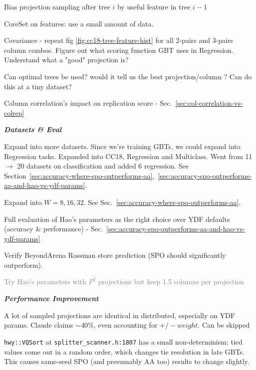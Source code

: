 \documentclass[sigconf,screen]{acmart}
\newcommand{\done}{\rlap{$\square$}{\raisebox{2pt}{\large\hspace{1pt}\checkmark}}\hspace{-2.5pt}}
\begin{document}
\begin{todolist}
    \item Bias projection sampling after tree $i$ by useful feature in tree $i-1$
    \item CoreSet on features: use a small amount of data.
    \item Covariance - repeat fig \ref{fig:cc18-tree-feature-hist} for all 2-pairs and 3-pairs column combos. Figure out what scoring function GBT uses in Regression. Understand what a "good" projection is?
    \item Can optimal trees be used? would it tell us the best projection/column ? Can do this at a tiny dataset?
    \item[\done] [\textbf{Extra}] Column correlation's impact on replication score - Sec.~\ref{sec:col-correlation-vs-colrep}
\end{todolist}

\textbf{\textit{Datasets \& Eval}}

\begin{todolist}
    \item [\done] Expand into more datasets. Since we're training GBTs, we could expand into Regression tasks. Expanded into CC18, Regression and Multiclass. Went from 11 $\to$ 20 datasets on classification and added 6 regression. See Section~\ref{sec:accuracy-where-spo-outperforms-aa},~\ref{sec:accuracy-spo-outperforms-aa-and-hao-vs-ydf-params}.
    \item [\done] Expand into $W=8,16,32$. See Sec.~\ref{sec:accuracy-where-spo-outperforms-aa}.
    \item [\done] Full evaluation of Hao's parameters as the right choice over YDF defaults (accuracy \& performance) - Sec.~\ref{sec:accuracy-spo-outperforms-aa-and-hao-vs-ydf-params}
    \item Verify BeyondArena Rossman store prediction (SPO should significantly outperform).
    \item \textcolor{gray}{Try Hao's parameters with $F^2$ projections but keep 1.5 columns per projection}
\end{todolist}

\textbf{\textit{Performance Improvement}}

\begin{todolist}
    \item A lot of sampled projections are identical in distributed, especially on YDF params. Claude claims $\sim 40\%$, even accounting for $+/- weight$. Can be skipped
    \item \texttt{hwy::VQSort} at \texttt{splitter\_scanner.h:1807} has a small non-determinism: tied values come out in a random order, which changes tie resolution in late GBTs. This causes same-seed SPO (and presumably AA too) results to change slightly. %
\end{todolist}
\end{document}
